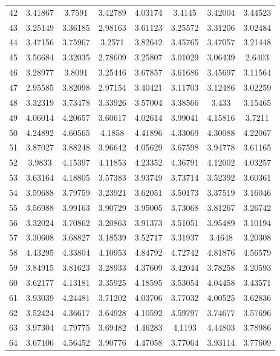 \begin{center}
\begin{longtable}{cccccccc}
42 & 3.41867 & 3.7591 & 3.42789 & 4.03174 & 3.4145 & 3.42004 & 3.44523\\
43 & 3.25149 & 3.36185 & 2.98163 & 3.61123 & 3.25572 & 3.31206 & 3.02484\\
44 & 3.47156 & 3.75967 & 3.2571 & 3.82642 & 3.45765 & 3.47057 & 3.21448\\
45 & 3.56684 & 3.32035 & 2.78609 & 3.25807 & 3.01029 & 3.06439 & 2.6403\\
46 & 3.28977 & 3.8091 & 3.25446 & 3.67857 & 3.61686 & 3.45697 & 3.11564\\
47 & 2.95585 & 3.82098 & 2.97154 & 3.40421 & 3.11703 & 3.12486 & 3.02259\\
48 & 3.32319 & 3.73478 & 3.33926 & 3.57004 & 3.38566 & 3.433 & 3.15465\\
49 & 4.06014 & 4.20657 & 3.60617 & 4.02614 & 3.99041 & 4.15816 & 3.7211\\
50 & 4.24892 & 4.60565 & 4.1858 & 4.41896 & 4.33069 & 4.30088 & 4.22067\\
51 & 3.87027 & 3.88248 & 3.96642 & 4.05629 & 3.67598 & 3.94778 & 3.61165\\
52 & 3.9833 & 4.15397 & 4.11853 & 4.23352 & 4.36791 & 4.12002 & 4.03257\\
53 & 3.63164 & 4.18805 & 3.57383 & 3.93749 & 3.73714 & 3.52392 & 3.60361\\
54 & 3.59688 & 3.79759 & 3.23921 & 3.62051 & 3.50173 & 3.37519 & 3.16046\\
55 & 3.56988 & 3.99163 & 3.90729 & 3.95005 & 3.73068 & 3.81267 & 3.26742\\
56 & 3.32024 & 3.70862 & 3.20863 & 3.91373 & 3.51051 & 3.95489 & 3.10194\\
57 & 3.30608 & 3.68827 & 3.18539 & 3.52717 & 3.31937 & 3.4648 & 3.20308\\
58 & 4.43295 & 4.33804 & 4.10953 & 4.84792 & 4.72742 & 4.81876 & 4.56579\\
59 & 3.84915 & 3.81623 & 3.28933 & 4.37609 & 3.42044 & 3.78258 & 3.20593\\
60 & 3.62177 & 4.13181 & 3.35925 & 4.18595 & 3.53054 & 4.04458 & 3.43571\\
61 & 3.93039 & 4.24481 & 3.71202 & 4.03706 & 3.77032 & 4.00525 & 3.62836\\
62 & 3.52424 & 4.36617 & 3.64928 & 4.10592 & 3.59797 & 3.74677 & 3.57696\\
63 & 3.97304 & 4.79775 & 3.69482 & 4.46283 & 4.1193 & 4.44803 & 3.78986\\
64 & 3.67106 & 4.56452 & 3.90776 & 4.47058 & 3.77064 & 3.93114 & 3.77609\\

\end{longtable}
\end{center}
